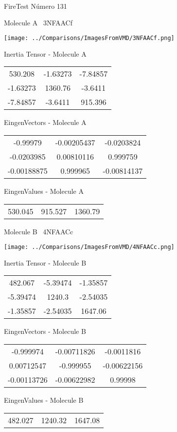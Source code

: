 \vtab[-3cm]
\begin{center}
{\large FireTest \tab Número 131}
\end{center}
\begin{multicols}{2}
\begin{center}

Molecule A \
3NFAACf

\texttt{[image: ../Comparisons/ImagesFromVMD/3NFAACf.png]}

Inertia Tensor - Molecule A \\
\begin{tabular}{|c c c|}
530.208	 & 	-1.63273	 & 	-7.84857	 \\
-1.63273	 & 	1360.76	 & 	-3.6411	 \\
-7.84857	 & 	-3.6411	 & 	915.396
\end{tabular}

\vtab
 EingenVectors - Molecule A     \\
\begin{tabular}{|c c c|}
-0.99979	 & 	-0.00205437	 & 	-0.0203824	 \\
-0.0203985	 & 	0.00810116	 & 	0.999759	 \\
-0.00188875	 & 	0.999965	 & 	-0.00814137
\end{tabular}

\vtab
 EingenValues - Molecule A     \\
\begin{tabular}{|c c c|}
530.045	 & 	915.527	 & 	1360.79	 \\
\end{tabular}
\columnbreak

Molecule B \
4NFAACc

\texttt{[image: ../Comparisons/ImagesFromVMD/4NFAACc.png]}

Inertia Tensor - Molecule B \\
\begin{tabular}{|c c c|}
482.067	 & 	-5.39474	 & 	-1.35857	 \\
-5.39474	 & 	1240.3	 & 	-2.54035	 \\
-1.35857	 & 	-2.54035	 & 	1647.06
\end{tabular}

\vtab
 EingenVectors - Molecule B     \\
\begin{tabular}{|c c c|}
-0.999974	 & 	-0.00711826	 & 	-0.0011816	 \\
0.00712547	 & 	-0.999955	 & 	-0.00622156	 \\
-0.00113726	 & 	-0.00622982	 & 	0.99998
\end{tabular}

\vtab
 EingenValues - Molecule B     \\
\begin{tabular}{|c c c|}
482.027	 & 	1240.32	 & 	1647.08	 \\
\end{tabular}

\end{center}
\end{multicols}

